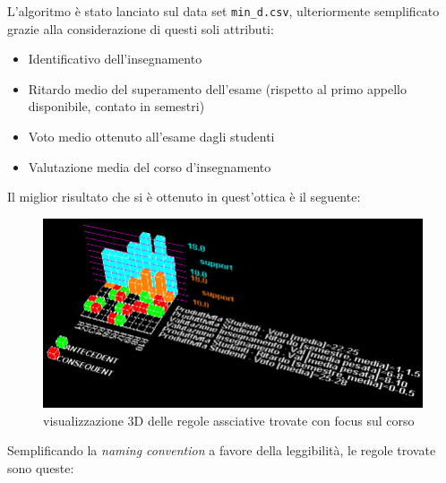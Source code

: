             L'algoritmo è stato lanciato sul data set \texttt{min\_d.csv}, ulteriormente semplificato grazie alla considerazione di questi soli attributi:

            \begin{itemize}
                \item Identificativo dell'insegnamento
                \item Ritardo medio del superamento dell'esame (rispetto al primo appello disponibile, contato in semestri)
                \item Voto medio ottenuto all'esame dagli studenti
                \item Valutazione media del corso d'insegnamento
            \end{itemize}

            Il miglior risultato che si è ottenuto in quest'ottica è il seguente: \\

            

            \begin{figure}
                \centering
                \caption{visualizzazione 3D delle regole assciative trovate con focus sul corso}
                \label{apriori_min_1}
	            \includegraphics[scale=0.48]{../ass/apriori_min_1.png}
            \end{figure}

            Semplificando la \textit{naming convention} a favore della leggibilità, le regole trovate sono queste:

